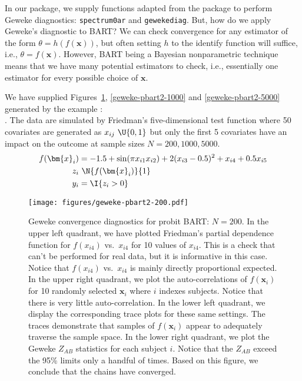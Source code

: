 \documentclass[article]{jss}
\begin{document}
In our  package, we supply  functions adapted
from the   package \citep{PlumBest06} to perform
Geweke diagnostics: {\tt spectrum0ar} and {\tt gewekediag}.  But, how
do we apply Geweke's diagnostic to BART?  We can check convergence for
any estimator of the form ${\theta}=h(f(\bm{x}))$, but often setting
$h$ to the identify function will suffice, i.e., ${\theta}=f(\bm{x})$.
However, BART being a Bayesian nonparametric technique means that we
have many potential estimators to check, i.e., essentially one
estimator for every possible choice of $\bm{x}$.

We have supplied Figures~\ref{geweke-pbart2-200},
\ref{geweke-pbart2-1000} and \ref{geweke-pbart2-5000} generated by
the example :\\ .  The data are simulated by Friedman's
five-dimensional test function \citep{Frie91} where 50 covariates are
generated as $x_{ij}~\U{0, 1}$ but only the first 5 covariates have an
impact on the outcome at sample sizes $N = 200, 1000, 5000$.
\begin{align*}
{f(\bm{x}_i)} & = -1.5+\sin(\pi x_{i1} x_{i2}) + 2 (x_{i3}-0.5)^2 +x_{i4}+0.5x_{i5} \\
z_i & ~\N{f(\bm{x}_i)}{1} \\
{y_i} & =\I{z_i>0} 
\end{align*}
\begin{figure}%
\begin{center}
\texttt{[image: figures/geweke-pbart2-200.pdf]}
\end{center}
\caption{\label{geweke-pbart2-200}Geweke convergence diagnostics for
  probit BART: $N=200$.  In the upper left quadrant, we have plotted
  Friedman's partial dependence function for $f(x_{i4})$ vs.\ $x_{i4}$
  for 10 values of $x_{i4}$.  This is a check that can't be performed
  for real data, but it is informative in this case.  Notice that
  $f(x_{i4})$ vs.\ $x_{i4}$ is mainly directly proportional expected.
  In the upper right quadrant, we plot the auto-correlations of
  $f(\bm{x}_i)$ for 10 randomly selected $\bm{x}_i$ where $i$ indexes
  subjects.  Notice that there is very little auto-correlation.  In
  the lower left quadrant, we display the corresponding trace plots
  for these same settings.  The traces demonstrate that samples of
  $f(\bm{x}_i)$ appear to adequately traverse the sample space.  In
  the lower right quadrant, we plot the Geweke $Z_{AB}$ statistics for
  each subject $i$.  Notice that the $Z_{AB}$ exceed the 95\% limits
  only a handful of times.  Based on this figure, we conclude that the
  chains have converged.  }
\end{figure}
\end{document}
